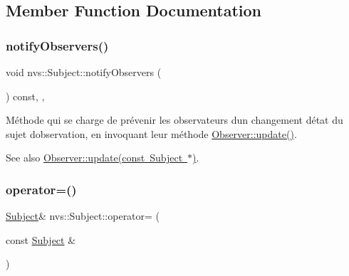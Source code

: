 \subsection{Member Function Documentation}
\mbox{\label{classnvs_1_1_subject_ac0c7f6fc31ec3dd61c1e102cb565cdf9}} 
\subsubsection{\texorpdfstring{notify\+Observers()}{notifyObservers()}}
{\footnotesize\ttfamily void nvs\+::\+Subject\+::notify\+Observers (\begin{DoxyParamCaption}{ }\end{DoxyParamCaption}) const\hspace{0.3cm}{\ttfamily [final]}, {\ttfamily [protected]}, {\ttfamily [virtual]}}



Méthode qui se charge de prévenir les observateurs d\textquotesingle{}un changement d\textquotesingle{}état du sujet d\textquotesingle{}observation, en invoquant leur méthode \mbox{\hyperlink{classnvs_1_1_observer_a4c0373c644180bdc48558e5248968b3a}{Observer\+::update()}}. 

\begin{DoxySeeAlso}{See also}
\mbox{\hyperlink{classnvs_1_1_observer_a4c0373c644180bdc48558e5248968b3a}{Observer\+::update(const Subject $\ast$)}}. 
\end{DoxySeeAlso}
\mbox{\label{classnvs_1_1_subject_aba16a1e0481f97b74a66468dab1d50bf}} 
\subsubsection{\texorpdfstring{operator=()}{operator=()}\hspace{0.1cm}{\footnotesize\ttfamily [1/2]}}
{\footnotesize\ttfamily \mbox{\hyperlink{classnvs_1_1_subject}{Subject}}\& nvs\+::\+Subject\+::operator= (\begin{DoxyParamCaption}\item[{const \mbox{\hyperlink{classnvs_1_1_subject}{Subject}} \&}]{ }\end{DoxyParamCaption})\hspace{0.3cm}{\ttfamily [default]}}



